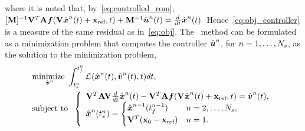 where it is noted that, by~\eqref{eq:controlled_rom}, $
[\massArgnt{n}]^{-1}\basisspace^T \stweightingMatArg{n} \velocity(\basisspace \genstateArg{n}{t} + \stateIntercept ,t) +
\mass^{-1}\controllerArg{n}{t}  = \frac{d}{dt}\genstateArg{n}{t}.$ 
Hence~\eqref{eq:obj_controller} is a measure of the same residual as in~\eqref{eq:obj}.  The \methodAcronym\ method can be formulated as a minimization problem 
that computes the controller $\controllerArgnt{n}$, for $n=1,\ldots,\nslabs$, as the solution to the minimization problem, 
\begin{equation}\label{eq:tclspg_oc1a} 
\begin{split}
&\underset{\controllerDumArgnt{n} }{\text{minimize } } 
\int_{\timeStartArg{n}}^{\timeEndArg{n}}
\objectiveControlArg{}(\genstateArg{n}{t},\controllerDumArg{n}{t},t)dt, 
 \\
&\text{subject to } \;  \left\{\begin{array}{l} 
 \basisspace^T \stweightingMatArgt{n}{t}
\basisspace \frac{d}{dt} \genstateArg{n}{t}  - \basisspace^T
\stweightingMatArgt{n}{t} \velocity(\basisspace \genstateArg{n}{t} +
\stateIntercept,t) =\controllerDumArg{n}{t}, \\
 \genstateArg{n}{\timeStartArg{n}} =
\begin{cases} \genstate^{n-1}(\timeEndArg{n-1} ) & n = 2,\ldots,\nslabs,
 \\ \basisspace^T(\stateFOMIC - \stateIntercept) & n=1. \end{cases} \end{array} \right.
\end{split}
\end{equation}
